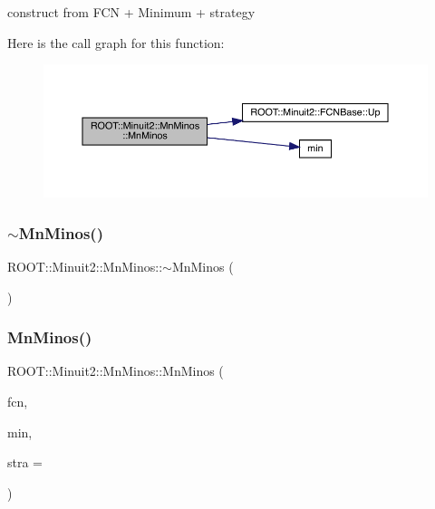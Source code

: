 construct from F\+CN + Minimum + strategy 

Here is the call graph for this function\+:
\nopagebreak
\begin{figure}[H]
\begin{center}
\leavevmode
\includegraphics[width=350pt]{dc/d91/classROOT_1_1Minuit2_1_1MnMinos_a80f912ade0dd48d937bc04b14e28623c_cgraph}
\end{center}
\end{figure}
\mbox{\label{classROOT_1_1Minuit2_1_1MnMinos_a64625d0dd4308a7c8fb8930c980f11bd}} 
\subsubsection{\texorpdfstring{$\sim$MnMinos()}{~MnMinos()}\hspace{0.1cm}{\footnotesize\ttfamily [1/3]}}
{\footnotesize\ttfamily R\+O\+O\+T\+::\+Minuit2\+::\+Mn\+Minos\+::$\sim$\+Mn\+Minos (\begin{DoxyParamCaption}{ }\end{DoxyParamCaption})\hspace{0.3cm}{\ttfamily [inline]}}

\mbox{\label{classROOT_1_1Minuit2_1_1MnMinos_ac64ec75423efa6e473ee722f08f47eb4}} 
\subsubsection{\texorpdfstring{MnMinos()}{MnMinos()}\hspace{0.1cm}{\footnotesize\ttfamily [3/6]}}
{\footnotesize\ttfamily R\+O\+O\+T\+::\+Minuit2\+::\+Mn\+Minos\+::\+Mn\+Minos (\begin{DoxyParamCaption}\item[{const \mbox{\hyperlink{classROOT_1_1Minuit2_1_1FCNBase}{F\+C\+N\+Base}} \&}]{fcn,  }\item[{const \mbox{\hyperlink{classROOT_1_1Minuit2_1_1FunctionMinimum}{Function\+Minimum}} \&}]{min,  }\item[{unsigned int}]{stra = {} }\end{DoxyParamCaption})}



